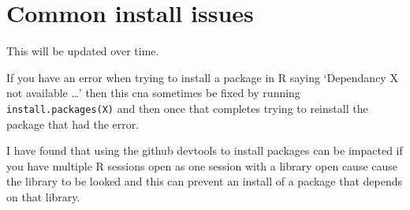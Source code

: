 \documentclass[]{article}
\begin{document}
\section{Common install issues}\label{common-install-issues}

This will be updated over time.

If you have an error when trying to install a package in R saying
`Dependancy X not available \ldots{}' then this cna sometimes be fixed
by running
\texttt{install.packages(\textquotesingle{}X\textquotesingle{})} and
then once that completes trying to reinstall the package that had the
error.

I have found that using the github devtools to install packages can be
impacted if you have multiple R sessions open as one session with a
library open cause cause the library to be looked and this can prevent
an install of a package that depends on that library.
\end{document}
